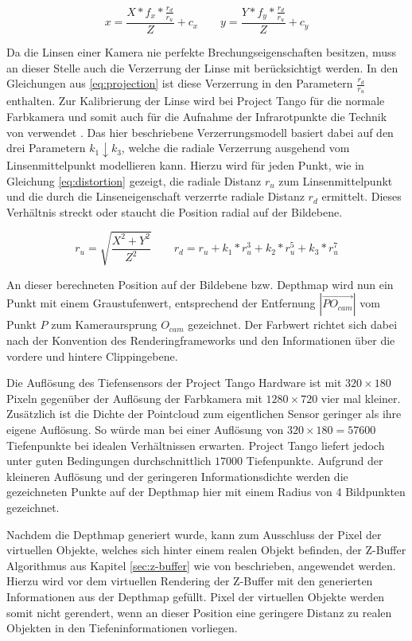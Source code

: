 \begin{equation}\label{eq:projection}
x = \frac{X* f_x * \frac{r_d}{r_u}}{Z}  + c_x
\qquad
y = \frac{Y* f_y * \frac{r_d}{r_u}}{Z}  + c_y
\end{equation}

Da die Linsen einer Kamera nie perfekte Brechungseigenschaften besitzen, muss an dieser Stelle auch die Verzerrung der Linse mit berücksichtigt werden. In den Gleichungen aus \ref{eq:projection} ist diese Verzerrung in den Parametern \(\frac{r_d}{r_u}\) enthalten. Zur Kalibrierung der Linse wird bei Project Tango für die normale Farbkamera und somit auch für die Aufnahme der Infrarotpunkte die Technik von \citet{tsai1987versatile} verwendet  \citep{Tango90:online}. Das hier beschriebene Verzerrungsmodell basiert dabei auf den drei Parametern \(k_{1} \downarrow  k_{3}\), welche die radiale Verzerrung ausgehend vom Linsenmittelpunkt modellieren kann. Hierzu wird für jeden Punkt, wie in Gleichung \ref{eq:distortion} gezeigt, die radiale Distanz \(r_u\) zum Linsenmittelpunkt und die durch die Linseneigenschaft verzerrte radiale Distanz \(r_d\) ermittelt. Dieses Verhältnis streckt oder staucht die Position radial auf der Bildebene.


\begin{equation} \label{eq:distortion}
r_u = \sqrt{\frac{X^2 + Y^2}{ Z^2}} 
\qquad
r_d = r_u + k_1 * r_u^3 + k_2 * r_u^5 + k_3 * r_u^7
\end{equation}

An dieser berechneten Position auf der Bildebene bzw. Depthmap wird nun ein Punkt mit einem Graustufenwert, entsprechend der Entfernung \(|\overrightarrow{PO_{cam}}|\) vom Punkt \(P\) zum Kameraursprung \(O_{cam}\) gezeichnet. Der Farbwert richtet sich dabei nach der Konvention des Renderingframeworks und den Informationen über die vordere und hintere Clippingebene.

Die Auflösung des Tiefensensors der Project Tango Hardware ist mit \(320 \times 180\) Pixeln gegenüber der Auflösung der Farbkamera mit \(1280 \times 720\) vier mal kleiner. Zusätzlich ist die Dichte der Pointcloud zum eigentlichen Sensor geringer als ihre eigene Auflösung. So würde man bei einer Auflösung von \(320 \times 180 = 57600\) Tiefenpunkte bei idealen Verhältnissen erwarten. Project Tango liefert jedoch unter guten Bedingungen durchschnittlich \(17000\) Tiefenpunkte. Aufgrund der kleineren Auflösung und der geringeren Informationsdichte werden die gezeichneten Punkte auf der Depthmap hier mit einem Radius von 4 Bildpunkten gezeichnet. 

Nachdem die Depthmap generiert wurde, kann zum Ausschluss der Pixel der virtuellen Objekte, welches sich hinter einem realen Objekt befinden, der Z-Buffer Algorithmus aus Kapitel \ref{sec:z-buffer} wie von \citet{wloka1995resolving} beschrieben, angewendet werden. Hierzu wird vor dem virtuellen Rendering der Z-Buffer mit den generierten Informationen aus der Depthmap gefüllt. Pixel der virtuellen Objekte werden somit nicht gerendert, wenn an dieser Position eine geringere Distanz zu realen Objekten in den Tiefeninformationen vorliegen. 


